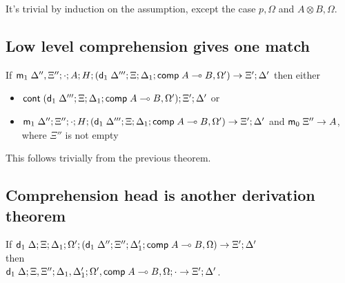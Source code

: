 It's trivial by induction on the assumption, except the case $p, \Omega$ and $A \otimes B, \Omega$.

\subsection{Low level comprehension gives one match}

If $\mathsf{m}_1 \; \Delta'', \Xi''; \cdot; A ; H; (\mathsf{d}_1 \; \Delta'''; \Xi; \Delta_1; \mathsf{comp} \; A \multimap B, \Omega') \rightarrow \Xi'; \Delta'$ then either

\begin{itemize}
\item $\mathsf{cont} \; (\mathsf{d}_1 \; \Delta'''; \Xi; \Delta_1; \mathsf{comp} \; A \multimap B, \Omega'); \Xi'; \Delta'$ or
\item $\mathsf{m}_1 \; \Delta'' ; \Xi''; \cdot; H; (\mathsf{d}_1 \; \Delta'''; \Xi; \Delta_1; \mathsf{comp} \; A \multimap B, \Omega') \rightarrow \Xi'; \Delta'$ and $\mathsf{m}_0 \; \Xi'' \rightarrow A$, where $\Xi''$ is not empty
\end{itemize}

This follows trivially from the previous theorem.

\subsection{Comprehension head is another derivation theorem}

If $\mathsf{d}_1 \; \Delta; \Xi; \Delta_1; \Omega'; (\mathsf{d}_1 \; \Delta''; \Xi''; \Delta'_1; \mathsf{comp} \; A \multimap B, \Omega) \rightarrow \Xi'; \Delta'$ \\ then \\ $\mathsf{d}_1 \; \Delta; \Xi, \Xi''; \Delta_1, \Delta'_1; \Omega', \mathsf{comp} \; A \multimap B, \Omega; \cdot \rightarrow \Xi'; \Delta'$.

